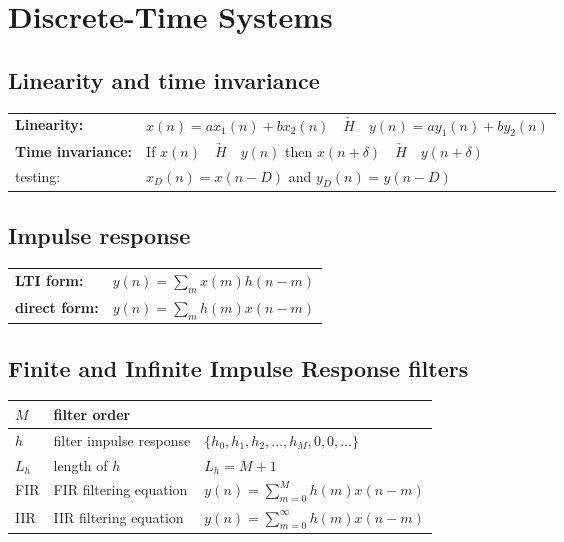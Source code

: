 \section{Discrete-Time Systems}
\subsection{Linearity and time invariance}
\begin{tabular}{ll}
\textbf{Linearity:} & $x(n) = ax_1(n) + bx_2(n) \quad \underrightarrow{H} \quad y(n) = ay_1(n) + by_2(n)$\\
\textbf{Time invariance:} & If $x(n) \quad \underrightarrow{H} \quad y(n)$ then $x(n+\delta) \quad \underrightarrow{H} \quad y(n+\delta)$\\
testing: & $x_D(n)=x(n-D)$ and $y_D(n)=y(n-D)$\\
\end{tabular}

\subsection{Impulse response}
\begin{tabular}{ll}
	\textbf{LTI form:}		& $y(n) = \sum\limits_m x(m)h(n-m)$ \\
	\textbf{direct form:}	& $y(n) = \sum\limits_m h(m)x(n-m)$
\end{tabular}


\subsection{Finite and Infinite Impulse Response filters}
\begin{tabularx}{0.75\textwidth}{|l|X|X|}
	\hline
	$M$	& filter order				& 
	\\ \hline
	$h$	& filter impulse response	& $\{ h_0, h_1, h_2, \ldots , h_M, 0, 0, \ldots\}$
	\\ \hline
	$L_h$	& length of $h$			& $L_h = M + 1$
	\\ \hline
	FIR		& FIR filtering equation	& $y(n) = \sum\limits_{m=0}^{M} h(m)x(n-m)$
	\\ \hline
	IIR		& IIR filtering equation	& $y(n) = \sum\limits_{m=0}^{\infty} h(m)x(n-m)$
	\\ \hline
\end{tabularx}
\resetArrayStretch

